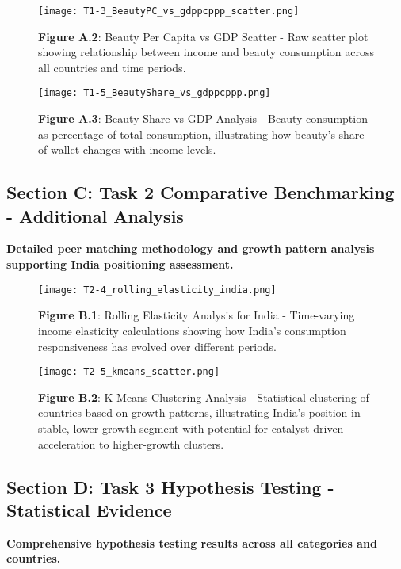 \documentclass[11pt]{article}
\begin{document}
\begin{figure}[H]
\centering
\texttt{[image: T1-3\_BeautyPC\_vs\_gdppcppp\_scatter.png]}
\caption{\textbf{Figure A.2}: Beauty Per Capita vs GDP Scatter - Raw scatter plot showing relationship between income and beauty consumption across all countries and time periods.}
\end{figure}

\begin{figure}[H]
\centering
\texttt{[image: T1-5\_BeautyShare\_vs\_gdppcppp.png]}
\caption{\textbf{Figure A.3}: Beauty Share vs GDP Analysis - Beauty consumption as percentage of total consumption, illustrating how beauty's share of wallet changes with income levels.}
\end{figure}


\subsection*{Section C: Task 2 Comparative Benchmarking - Additional Analysis}

\textbf{Detailed peer matching methodology and growth pattern analysis supporting India positioning assessment.}


\begin{figure}[H]
\centering
\texttt{[image: T2-4\_rolling\_elasticity\_india.png]}
\caption{\textbf{Figure B.1}: Rolling Elasticity Analysis for India - Time-varying income elasticity calculations showing how India's consumption responsiveness has evolved over different periods.}
\end{figure}

\begin{figure}[H]
\centering
\texttt{[image: T2-5\_kmeans\_scatter.png]}
\caption{\textbf{Figure B.2}: K-Means Clustering Analysis - Statistical clustering of countries based on growth patterns, illustrating India's position in stable, lower-growth segment with potential for catalyst-driven acceleration to higher-growth clusters.}
\end{figure}

\subsection*{Section D: Task 3 Hypothesis Testing - Statistical Evidence}

\textbf{Comprehensive hypothesis testing results across all categories and countries.}
\end{document}
